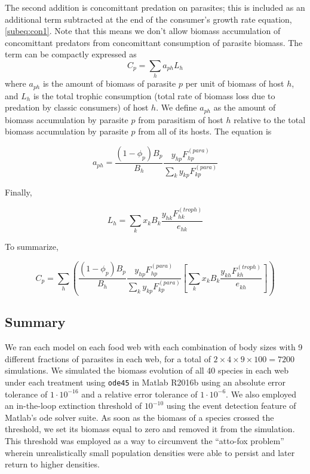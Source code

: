 \documentclass[/home/nkappler/Research/Dissertation/dissertation.tex]{subfiles}
\begin{document}
\begin{bibunit}
The second addition is concomittant predation on parasites; this is included as
an additional term subtracted at the end of the consumer's growth rate
equation, \eqref{subeq:con1}. Note that this means we don't allow biomass
accumulation of concomittant predators from concomittant consumption of
parasite biomass. The term can be compactly expressed as \begin{equation} C_p =
\sum_ha_{ph}L_h \label{cp1} \end{equation} where $a_{ph}$ is the amount of
biomass of parasite $p$ per unit of biomass of host $h$, and $L_h$ is the total
trophic consumption (total rate of biomass loss due to predation by classic
consumers) of host $h$. We define $a_{ph}$ as the amount of biomass
accumulation by parasite $p$ from parasitism of host $h$ relative to the total
biomass accumulation by parasite $p$ from all of its hosts. The equation is 

\begin{equation}
    a_{ph} = \frac{(1-\phi_p)B_p}{B_h}\frac{y_{hp}^{}F_{hp}^{(para)}}{\sum_{k}y_{kp}^{}F^{(para)}_{kp}} \label{eq:aph1}
\end{equation}

Finally,

\begin{equation}
    L_h = \sum_kx_kB_k\frac{y^{}_{hk}F^{(troph)}_{hk}}{e^{}_{hk}} \label{eq:Th1}
\end{equation}

To summarize,

\begin{equation}
    C_p = \sum_h \left(\frac{(1-\phi_p)B_p}{B_h} \frac{y_{hp}^{}F^{(para)}_{hp}}{\sum_{k}y_{kp}^{}F^{(para)}_{kp}} \left[\sum_kx_kB_k\frac{y_{kh}^{}F^{(troph)}_{kh}}{e_{kh}^{}}\right]  \right) \label{eq:cp2}
\end{equation}

\subsection{Summary}


We ran each model on each food web with each combination of body sizes with 9
different fractions of parasites in each web, for a total of
$2\times4\times9\times 100 =7200$ simulations. We simulated the biomass
evolution of all 40 species in each web under each treatment using \verb|ode45|
in Matlab R2016b using an absolute error tolerance of $1\cdot10^{-16}$ and a
relative error tolerance of $1\cdot10^{-6}$. We also employed an in-the-loop
extinction threshold of $10^{-10}$ using the event detection feature of
Matlab's ode solver suite. As soon as the biomass of a species crossed the
threshold, we set its biomass equal to zero and removed it from the simulation.
This threshold was employed as a way to circumvent the ``atto-fox problem''
wherein unrealistically small population densities were able to persist and
later return to higher densities.



\end{bibunit}
\end{document}
